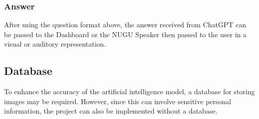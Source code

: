 \subsubsection{\textbf{Answer}}
After using the question format above, the answer received from ChatGPT can be passed to the Dashboard or the NUGU Speaker then passed to the user in a visual or auditory representation.\\

\subsection{\textbf{Database}}
To enhance the accuracy of the artificial intelligence model, a database for storing images may be required. However, since this can involve sensitive personal information, the project can also be implemented without a database.\\